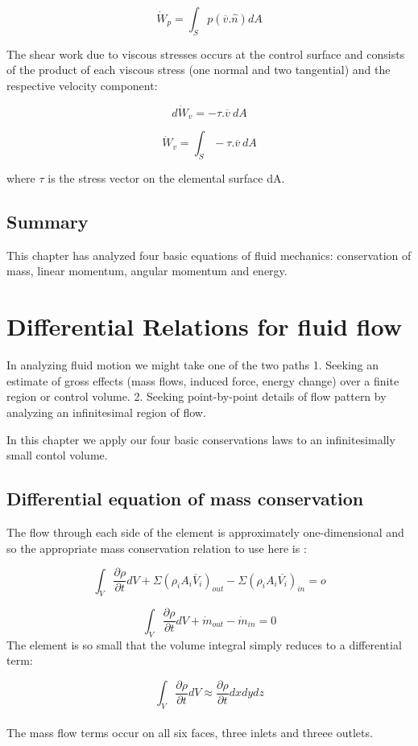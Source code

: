 \documentclass{report}
\begin{document}
\[ \dot{W}_p = \int_S p(\overline{v}.\hat{n}) dA\]

The shear work due to viscous stresses occurs at the control surface and consists of the product of each viscous stress
(one normal and two tangential) and the respective velocity component:

\[d\dot{W}_v = -\tau . \overline{v}\ dA\]

\[\dot{W}_v = \int_S -\tau . \overline{v}\ dA\]

where \(\tau\) is the stress vector on the elemental surface dA.

\section{Summary}
This chapter has analyzed four basic equations of fluid mechanics: conservation of mass, linear momentum, angular momentum and energy.

\chapter{Differential Relations for fluid flow}
In analyzing fluid motion we might take one of the two paths 
1. Seeking an estimate of gross effects (mass flows, induced force, energy change) over a finite region or control volume.
2. Seeking point-by-point details of flow pattern by analyzing an infinitesimal region of flow.

In this chapter we apply our four basic conservations laws to an infinitesimally small contol volume.


\section{Differential equation of mass conservation}
The flow through each side of the element is approximately one-dimensional and so the appropriate
mass conservation relation to use here is :

\[ \int_V \frac{\partial \rho}{\partial t} dV + \Sigma (\rho_i A_i \overline{V}_i)_{out} - \Sigma (\rho_i A_i\overline{V_i})_{in} = o\]

\[ \int_V \frac{\partial \rho}{\partial t} dV + \dot{m}_{out} - \dot{m}_{in} = 0 \]
The element is so small that the volume integral simply reduces to a differential term:

\[ \int_V \frac{\partial \rho}{\partial t} dV \approx \frac{\partial \rho}{\partial t} dx dy dz \]\\

The mass flow terms occur on all six faces, three inlets and threee outlets.
\end{document}
